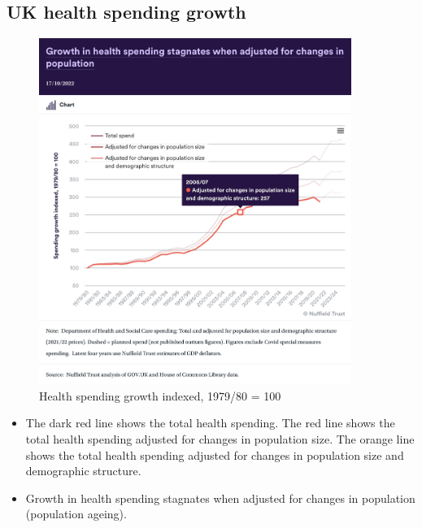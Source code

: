         \subsection{UK health spending growth} 
        \begin{figure}[H]%
                \centering
                \includegraphics[width=4in]{images/ch3/8.png}
                \caption{Health spending growth indexed, 1979/80 = 100}
                \label{fig:label}
            \end{figure} 
\begin{itemize}           
        \item The dark red line shows the total health spending. The red line shows the total health spending adjusted for changes in population size. The orange line shows the total health spending adjusted for changes in population size and demographic structure.
        \item Growth in health spending stagnates when adjusted for changes in population (population ageing).
        \end{itemize}       

